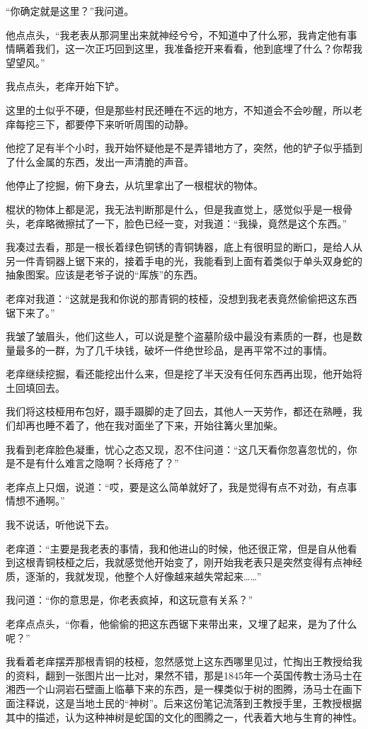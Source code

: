 “你确定就是这里？”我问道。

他点点头，“我老表从那洞里出来就神经兮兮，不知道中了什么邪，我肯定他有事情瞒着我们，这一次正巧回到这里，我准备挖开来看看，他到底埋了什么？你帮我望望风。”

我点点头，老痒开始下铲。

这里的土似乎不硬，但是那些村民还睡在不远的地方，不知道会不会吵醒，所以老痒每挖三下，都要停下来听听周围的动静。

他挖了足有半个小时，我开始怀疑他是不是弄错地方了，突然，他的铲子似乎插到了什么金属的东西，发出一声清脆的声音。

他停止了挖掘，俯下身去，从坑里拿出了一根棍状的物体。

棍状的物体上都是泥，我无法判断那是什么，但是我直觉上，感觉似乎是一根骨头，老痒略微擦拭了一下，脸色已经一变，对我道：“我操，竟然是这个东西。”

我凑过去看，那是一根长着绿色铜锈的青铜铸器，底上有很明显的断口，是给人从另一件青铜器上锯下来的，接着手电的光，我能看到上面有着类似于单头双身蛇的抽象图案。应该是老爷子说的“厍族”的东西。

老痒对我道：“这就是我和你说的那青铜的枝桠，没想到我老表竟然偷偷把这东西锯下来了。”

我皱了皱眉头，他们这些人，可以说是整个盗墓阶级中最没有素质的一群，也是数量最多的一群，为了几千块钱，破坏一件绝世珍品，是再平常不过的事情。

老痒继续挖掘，看还能挖出什么来，但是挖了半天没有任何东西再出现，他开始将土回填回去。

我们将这枝桠用布包好，蹑手蹑脚的走了回去，其他人一天劳作，都还在熟睡，我们却再也睡不着了，他在我对面坐了下来，开始往篝火里加柴。

我看到老痒脸色凝重，忧心之态又现，忍不住问道：“这几天看你忽喜忽忧的，你是不是有什么难言之隐啊？长痔疮了？”

老痒点上只烟，说道：“哎，要是这么简单就好了，我是觉得有点不对劲，有点事情想不通啊。”

我不说话，听他说下去。

老痒道：“主要是我老表的事情，我和他进山的时候，他还很正常，但是自从他看到这根青铜枝桠之后，我就感觉他开始变了，刚开始我老表只是突然变得有点神经质，逐渐的，我就发现，他整个人好像越来越失常起来……”

我问道：“你的意思是，你老表疯掉，和这玩意有关系？”

老痒点点头，“你看，他偷偷的把这东西锯下来带出来，又埋了起来，是为了什么呢？”

我看着老痒摆弄那根青铜的枝桠，忽然感觉上这东西哪里见过，忙掏出王教授给我的资料，翻到一张图片出一比对，果然不错，那是1845年一个英国传教士汤马士在湘西一个山洞岩石壁画上临摹下来的东西，是一棵类似于树的图腾，汤马士在画下面注释说，这是当地土民的“神树”。后来这份笔记流落到王教授手里，王教授根据其中的描述，认为这种神树是蛇国的文化的图腾之一，代表着大地与生育的神性。


